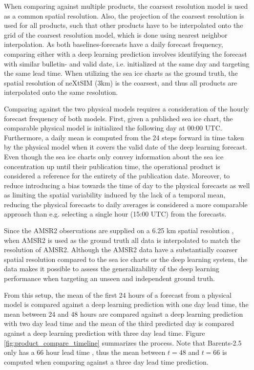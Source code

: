 \documentclass[../main/thesis.tex]{subfiles}
\begin{document}
When comparing against multiple products, the coarsest resolution model is used as a common spatial resolution. Also, the projection of the coarsest resolution is used for all products, such that other products have to be interpolated onto the grid of the coarsest resolution model, which is done using nearest neighbor interpolation. As both baselines-forecasts have a daily forecast frequency, comparing either with a deep learning prediction involves identifying the forecast with similar bulletin- and valid date, i.e. initialized at the same day and targeting the same lead time. When utilizing the sea ice charts as the ground truth, the spatial resolution of neXtSIM (3km) is the coarsest, and thus all products are interpolated onto the same resolution.

Comparing against the two physical models requires a consideration of the hourly forecast frequency \citep{Williams2021, Roehrs2022} of both models. First, given a published sea ice chart, the comparable physical model is initialized the following day at 00:00 UTC. Furthermore, a daily mean is computed from the 24 steps forward in time taken by the physical model when it covers the valid date of the deep learning forecast. Even though the sea ice charts only convey information about the sea ice concentration up until their publication time, the operational product is considered a reference for the entirety of the publication date. Moreover, to reduce introducing a bias towards the time of day to the physical forecasts as well as limiting the spatial variability induced by the lack of a temporal mean, reducing the physical forecasts to daily averages is considered a more comparable approach than e.g. selecting a single hour (15:00 UTC) from the forecasts.

Since the AMSR2 observations are supplied on a 6.25 km spatial resolution \citep{Spreen2008}, when AMSR2 is used as the ground truth all data is interpolated to match the resolution of AMSR2. Although the AMSR2 data have a substantially coarser spatial resolution compared to the sea ice charts or the deep learning system, the data makes it possible to assess the generalizability of the deep learning performance when targeting an unseen and independent ground truth.

From this setup, the mean of the first 24 hours of a forecast from a physical model is compared against a deep learning prediction with one day lead time, the mean between 24 and 48 hours are compared against a deep learning prediction with two day lead time and the mean of the third predicted day is compared against a deep learning prediction with three day lead time. Figure \ref{fig:product_compare_timeline} summarizes the process. Note that Barents-2.5 only has a 66 hour lead time \citep{Roehrs2022}, thus the mean between $t = 48$ and $t = 66$ is computed when comparing against a three day lead time prediction.
\end{document}
